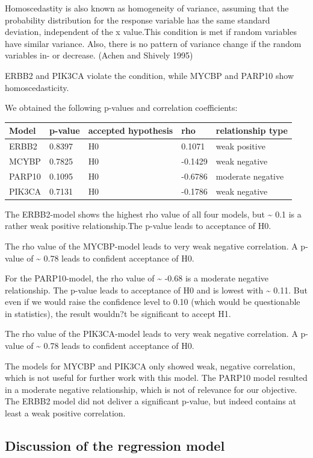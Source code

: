 \documentclass[]{article}
\begin{document}
Homoscedastity is also known as homogeneity of variance, assuming that
the probability distribution for the response variable has the same
standard deviation, independent of the x value.This condition is met if
random variables have similar variance. Also, there is no pattern of
variance change if the random variables in- or decrease. (Achen and
Shively 1995)

ERBB2 and PIK3CA violate the condition, while MYCBP and PARP10 show
homoscedasticity.

We obtained the following p-values and correlation coefficients:

\begin{longtable}[]{@{}lllll@{}}
\toprule
Model & p-value & accepted hypothesis & rho & relationship
type\tabularnewline
\midrule
\endhead
ERBB2 & 0.8397 & H0 & 0.1071 & weak positive\tabularnewline
MCYBP & 0.7825 & H0 & -0.1429 & weak negative\tabularnewline
PARP10 & 0.1095 & H0 & -0.6786 & moderate negative\tabularnewline
PIK3CA & 0.7131 & H0 & -0.1786 & weak negative\tabularnewline
\bottomrule
\end{longtable}

The ERBB2-model shows the highest rho value of all four models, but
\textasciitilde{} 0.1 is a rather weak positive relationship.The p-value
leads to acceptance of H0.

The rho value of the MYCBP-model leads to very weak negative
correlation. A p-value of \textasciitilde{} 0.78 leads to confident
acceptance of H0.

For the PARP10-model, the rho value of \textasciitilde{} -0.68 is a
moderate negative relationship. The p-value leads to acceptance of H0
and is lowest with \textasciitilde{} 0.11. But even if we would raise
the confidence level to 0.10 (which would be questionable in
statistics), the result wouldn?t be significant to accept H1.

The rho value of the PIK3CA-model leads to very weak negative
correlation. A p-value of \textasciitilde{} 0.78 leads to confident
acceptance of H0.

The models for MYCBP and PIK3CA only showed weak, negative correlation,
which is not useful for further work with this model. The PARP10 model
resulted in a moderate negative relationship, which is not of relevance
for our objective. The ERBB2 model did not deliver a significant
p-value, but indeed contains at least a weak positive correlation.

\hypertarget{discussion-of-the-regression-model}{%
\subsection{Discussion of the regression
model}\label{discussion-of-the-regression-model}}
\end{document}
